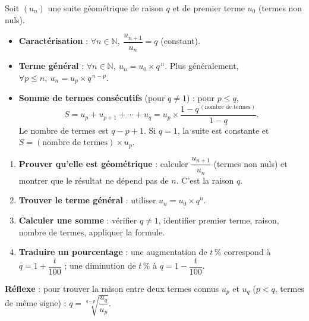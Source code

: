 \documentclass[11pt]{article}
\begin{document}
\begin{propriete}
Soit $(u_n)$ une suite géométrique de raison $q$ et de premier terme $u_0$ (termes non nuls).
\begin{itemize}
\item \textbf{Caractérisation} : $\forall n\in\mathbb{N},\ \dfrac{u_{n+1}}{u_n} = q$ (constant).
\item \textbf{Terme général} : $\forall n\in\mathbb{N},\ u_n = u_0 \times q^{\,n}$. Plus généralement, $\forall p\leq n,\ u_n = u_p \times q^{\,n-p}$.
\item \textbf{Somme de termes consécutifs} (pour $q\neq 1$) : pour $p\leq q$,
\[S = u_p + u_{p+1} + \cdots + u_q = u_p \times \frac{1-q^{\,(\text{nombre de termes})}}{1-q}.\]
Le nombre de termes est $q-p+1$. Si $q=1$, la suite est constante et $S = (\text{nombre de termes})\times u_p$.
\end{itemize}
\end{propriete}

\begin{methode}
\begin{enumerate}
\item \textbf{Prouver qu'elle est géométrique} : calculer $\dfrac{u_{n+1}}{u_n}$ (termes non nuls) et montrer que le résultat ne dépend pas de $n$. C'est la raison $q$.
\item \textbf{Trouver le terme général} : utiliser $u_n = u_0 \times q^n$.
\item \textbf{Calculer une somme} : vérifier $q\neq 1$, identifier premier terme, raison, nombre de termes, appliquer la formule.
\item \textbf{Traduire un pourcentage} : une augmentation de $t\,\%$ correspond à $q=1+\dfrac{t}{100}$ ; une diminution de $t\,\%$ à $q=1-\dfrac{t}{100}$.
\end{enumerate}
\textbf{Réflexe} : pour trouver la raison entre deux termes connus $u_p$ et $u_q$ ($p<q$, termes de même signe) : $q = \sqrt[q-p]{\dfrac{u_q}{u_p}}$.
\end{methode}
\end{document}
